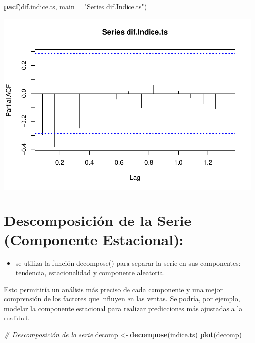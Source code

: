 \documentclass[
]{book}
\newenvironment{Shaded}{\begin{snugshade}}{\end{snugshade}}
\newcommand{\AttributeTok}[1]{\textcolor[rgb]{0.13,0.29,0.53}{#1}}
\newcommand{\CommentTok}[1]{\textcolor[rgb]{0.56,0.35,0.01}{\textit{#1}}}
\newcommand{\FunctionTok}[1]{\textcolor[rgb]{0.13,0.29,0.53}{\textbf{#1}}}
\newcommand{\NormalTok}[1]{#1}
\newcommand{\OtherTok}[1]{\textcolor[rgb]{0.56,0.35,0.01}{#1}}
\newcommand{\StringTok}[1]{\textcolor[rgb]{0.31,0.60,0.02}{#1}}
\providecommand{\tightlist}{%
  \setlength{\itemsep}{0pt}\setlength{\parskip}{0pt}}
\begin{document}
\begin{Shaded}
\begin{Highlighting}[]
\FunctionTok{pacf}\NormalTok{(dif.indice.ts, }\AttributeTok{main =} \StringTok{"Series dif.Indice.ts"}\NormalTok{)}
\end{Highlighting}
\end{Shaded}

\includegraphics{_main_files/figure-latex/unnamed-chunk-16-2.pdf}

\section{Descomposición de la Serie (Componente Estacional):}\label{descomposiciuxf3n-de-la-serie-componente-estacional}

\begin{itemize}
\tightlist
\item
  se utiliza la función decompose() para separar la serie en sus componentes: tendencia, estacionalidad y componente aleatoria.
\end{itemize}

Esto permitiría un análisis más preciso de cada componente y una mejor comprensión de los factores que influyen en las ventas. Se podría, por ejemplo, modelar la componente estacional para realizar predicciones más ajustadas a la realidad.

\begin{Shaded}
\begin{Highlighting}[]
\CommentTok{\# Descomposición de la serie}
\NormalTok{decomp }\OtherTok{\textless{}{-}} \FunctionTok{decompose}\NormalTok{(indice.ts) }
\FunctionTok{plot}\NormalTok{(decomp)}
\end{Highlighting}
\end{Shaded}
\end{document}
